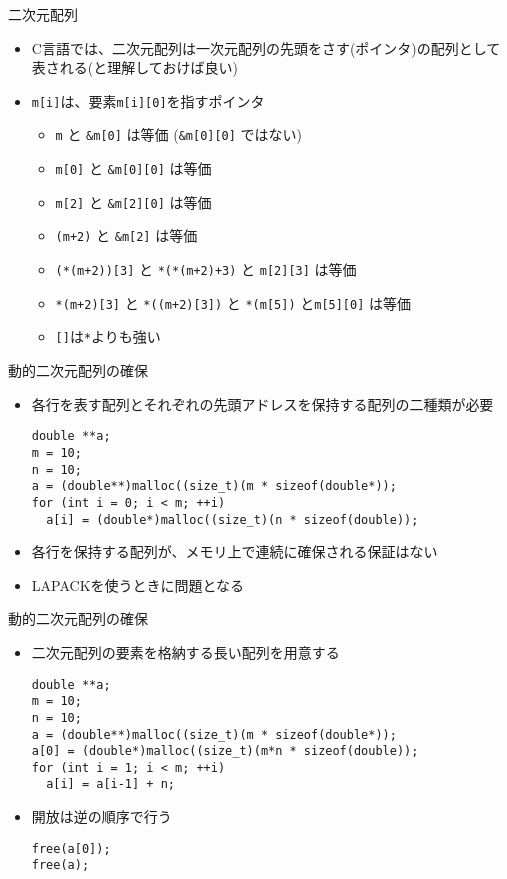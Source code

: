 \begin{frame}[t,fragile]{二次元配列}
  \begin{itemize}
    \setlength{\itemsep}{1em}
  \item C言語では、二次元配列は一次元配列の先頭をさす(ポインタ)の配列として表される(と理解しておけば良い)
  \item \verb+m[i]+は、要素\verb+m[i][0]+を指すポインタ
    \begin{itemize}
    \item \verb+m+ と \verb+&m[0]+ は等価 (\verb+&m[0][0]+ ではない)
    \item \verb+m[0]+ と \verb+&m[0][0]+ は等価
    \item \verb+m[2]+ と \verb+&m[2][0]+ は等価
    \item \verb^(m+2)^ と \verb^&m[2]^ は等価
    \item \verb^(*(m+2))[3]^ と \verb^*(*(m+2)+3)^ と \verb^m[2][3]^ は等価
    \item \verb^*(m+2)[3]^ と \verb^*((m+2)[3])^ と \verb^*(m[5])^ と\verb^m[5][0]^ は等価
    \item \verb^[]^は\verb^*^よりも強い
    \end{itemize}
  \end{itemize}
\end{frame}

\begin{frame}[t,fragile]{動的二次元配列の確保}
  \begin{itemize}
    \setlength{\itemsep}{1em}
  \item 各行を表す配列とそれぞれの先頭アドレスを保持する配列の二種類が必要
\begin{lstlisting}
double **a;
m = 10;  
n = 10;  
a = (double**)malloc((size_t)(m * sizeof(double*));
for (int i = 0; i < m; ++i)
  a[i] = (double*)malloc((size_t)(n * sizeof(double));
\end{lstlisting}
\item 各行を保持する配列が、メモリ上で連続に確保される保証はない
\item LAPACKを使うときに問題となる
  \end{itemize}
\end{frame}

\begin{frame}[t,fragile]{動的二次元配列の確保}
  \begin{itemize}
    \setlength{\itemsep}{1em}
  \item 二次元配列の要素を格納する長い配列を用意する
\begin{lstlisting}
double **a;
m = 10;  
n = 10;  
a = (double**)malloc((size_t)(m * sizeof(double*));
a[0] = (double*)malloc((size_t)(m*n * sizeof(double));
for (int i = 1; i < m; ++i)
  a[i] = a[i-1] + n;
\end{lstlisting}
  \item 開放は逆の順序で行う
\begin{lstlisting}
free(a[0]);
free(a);
\end{lstlisting}
  \end{itemize}
\end{frame}

